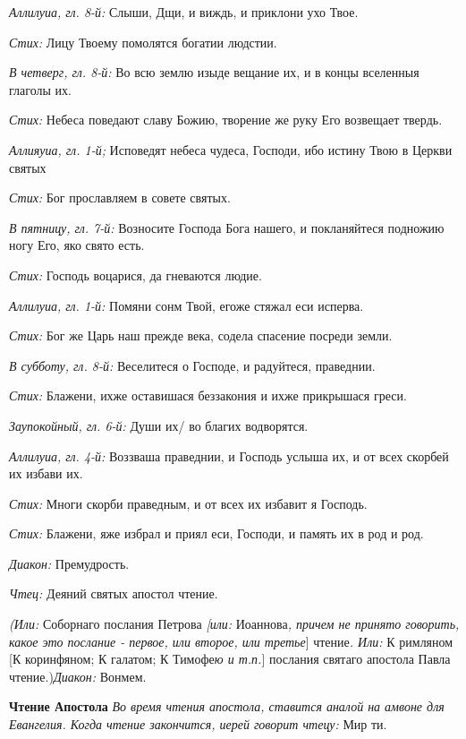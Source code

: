{\itshape Аллилуиа, гл. 8-й:} Слыши, Дщи, и виждь, и приклони ухо Твое.

{\itshape Стих:} Лицу Твоему помолятся богатии людстии.

{\itshape В четверг, гл. 8-й:} Во всю землю изыде вещание их, и в концы вселенныя глаголы их.

{\itshape Стих:} Небеса поведают славу Божию, творение же руку Его возвещает твердь.

{\itshape Аллияуиа, гл. 1-й;} Исповедят небеса чудеса, Господи, ибо истину Твою в Церкви святых

{\itshape Стих:} Бог прославляем в совете святых.

{\itshape В пятницу, гл. 7-й:} Возносите Господа Бога нашего, и покланяйтеся подножию ногу Его, яко свято есть.

{\itshape Стих:} Господь воцарися, да гневаются людие.

{\itshape Аллилуиа, гл. 1-й:} Помяни сонм Твой, егоже стяжал еси исперва.

{\itshape Стих:} Бог же Царь наш прежде века, содела спасение посреди земли. 

{\itshape В субботу, гл. 8-й:} Веселитеся о Господе, и радуйтеся, праведнии.

{\itshape  Стих:} Блажени, ихже оставишася беззакония и ихже прикрышася греси.

{\itshape  Заупокойный, гл. 6-й:} Души их/ во благих водворятся.

{\itshape  Аллилуиа, гл. 4-й:} Воззваша праведнии, и Господь услыша их, и от всех скорбей их избави их.

{\itshape  Стих:} Многи скорби праведным, и от всех их избавит я Господь.

{\itshape  Стих:} Блажени, яже избрал и приял еси, Господи, и память их в род и род.

{\itshape Диакон:} Премудрость.

{\itshape  Чтец:} Деяний святых апостол чтение.

{\itshape (Или:} Соборнаго послания Петрова {\itshape [или:} Иоаннова{\itshape , причем не принято говорить, какое это послание - первое, или второе, или третье}] чтение{\itshape . Или:} К римляном [К коринфяном; К галатом; К Тимофе{\itshape ю и т.п.}] послания святаго апостола Павла чтение.){\itshape  Диакон:} Вонмем.

{\bfseries Чтение Апостола }
{\itshape Во время чтения апостола, ставится аналой на амвоне для Евангелия. Когда чтение закончится, иерей говорит чтецу:} Мир ти.

